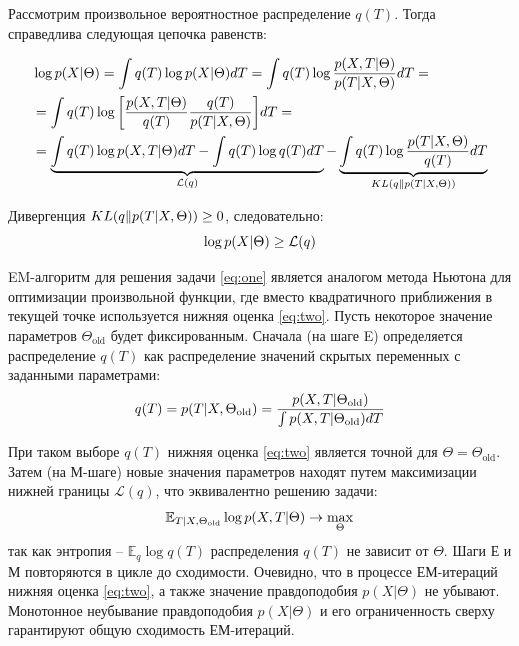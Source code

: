 Рассмотрим произвольное вероятностное распределение $q(T)$. Тогда справедлива следующая цепочка равенств:

\begin{align*} 
 &\log{p(X \arrowvert \Theta)} = \int{q(T) \log{p(X \arrowvert \Theta)} dT} = \int{q(T) \log{\frac{p(X,T \arrowvert \Theta)}{p(T \arrowvert X, \Theta)}} dT} =\\ & =\int{q(T) \log{  \bigg[ \frac{p(X,T \arrowvert \Theta)}{q(T)} \frac{q(T)}{p(T \arrowvert X, \Theta)}  \bigg] } dT} =  \\ 
 &=  \underbrace{\int{q(T) \log{p(X,T \arrowvert \Theta)} dT} - \int{q(T) \log{q(T)} dT}}_{\mathcal{L}(q)} - \underbrace{\int{q(T) \log{\frac{p(T \arrowvert X, \Theta)}{q(T)}} dT}}_{KL(q \| p(T \arrowvert X, \Theta) )}
\end{align*}

Дивергенция $KL(q \| p(T \arrowvert X, \Theta) ) \geq 0$, следовательно:
\begin{equation} \label{eq:two}
	\log{p(X \arrowvert \Theta)} \geq \mathcal{L}(q)
\end{equation}

EM-алгоритм для решения задачи \eqref{eq:one} является аналогом метода Ньютона для оптимизации произвольной функции, где вместо квадратичного приближения в текущей точке используется нижняя оценка \eqref{eq:two}. Пусть некоторое значение параметров $\Theta_{\text{old}}$ будет фиксированным. Сначала (на шаге E) определяется распределение $q(T)$ как распределение значений скрытых переменных с заданными параметрами:
\begin{equation} \label{eq:three}
	q(T) = p(T \arrowvert X, \Theta_{\text{old}}) = \frac{p(X, T \arrowvert \Theta_{\text{old}})}{\int{p(X, T \arrowvert \Theta_{\text{old}}) dT}}
\end{equation}

При таком выборе $q(T)$ нижняя оценка \eqref{eq:two} является точной для $\Theta = \Theta_{\text{old}}$. Затем (на М-шаге) новые значения параметров находят путем максимизации нижней границы $\mathcal{L}(q)$, что эквивалентно решению задачи:
\begin{equation} \label{eq:four}
 \mathbb{E}_{T \arrowvert X,  \Theta_{\text{old}}}\log{p(X, T \arrowvert \Theta)} \rightarrow \max\limits_{\Theta}^{}
\end{equation}
так как энтропия -- $\mathbb{E}_q \log{q(T)}$ распределения $q(T)$ не зависит от $\Theta$. Шаги Е и М повторяются в цикле до сходимости. Очевидно, что в процессе ЕМ-итераций нижняя оценка \eqref{eq:two}, а также значение правдоподобия $p(X| \Theta)$ не убывают. Монотонное неубывание правдоподобия $p(X|\Theta)$ и его ограниченность сверху гарантируют общую сходимость ЕМ-итераций.

